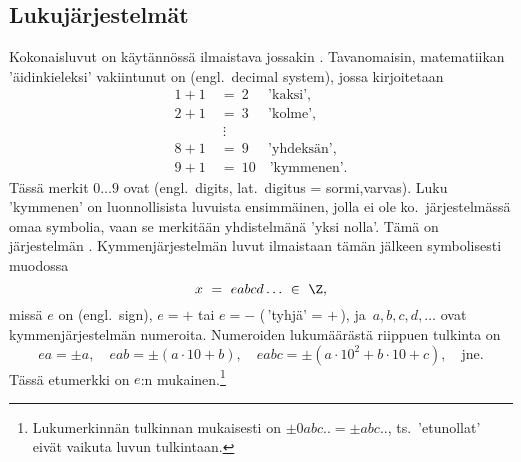 \subsection{Lukujärjestelmät}
Kokonaisluvut on käytännössä ilmaistava jossakin . Tavanomaisin, 
matematiikan 'äidinkieleksi' vakiintunut on  (engl.\ decimal system), 
jossa kirjoitetaan
\begin{align*}
1+1\ &=\ 2 \quad\ \,\text{'kaksi'}, \\
2+1\ &=\ 3 \quad\ \,\text{'kolme'}, \\
     &\ \vdots \\
8+1\ &=\ 9 \quad\ \,\text{'yhdeksän'}, \\
9+1\ &=\ 10 \quad \text{'kymmenen'}.
\end{align*}
Tässä merkit $0 \ldots 9$ ovat  (engl.\ digits, lat.\ 
digitus = sormi,varvas). Luku 'kymmenen' on luonnollisista luvuista ensimmäinen, jolla ei ole 
ko.\ järjestelmässä omaa symbolia, vaan se merkitään yhdistelmänä 'yksi nolla'. Tämä on 
järjestelmän \kor{kantaluku}. Kymmenjärjestelmän luvut ilmaistaan tämän jälkeen symbolisesti 
muodossa 
\[
x\ =\ eabcd \ldots\ \in\ \Z,
\]
missä $e$ on  (engl.\ sign), $e=+$ tai $e=-$ (\,'tyhjä' = $+$\,), ja 
$\,a,b,c,d, \ldots$ ovat kymmenjärjestelmän numeroita. Numeroiden lukumäärästä riippuen tulkinta
on
\[
ea = \pm a, \quad eab = \pm (a \cdot 10 + b), \quad 
                 eabc = \pm(a \cdot 10^2 + b \cdot 10 + c), \quad \text{jne.}
\]
Tässä etumerkki on $e$:n mukainen.\footnote[2]{Lukumerkinnän tulkinnan mukaisesti on
$\pm 0abc .. = \pm abc ..$, ts.\ 'etunollat' eivät vaikuta luvun tulkintaan.} 

